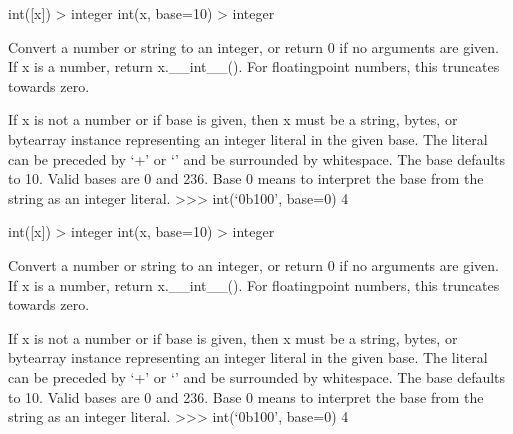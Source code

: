 \documentclass[letterpaper,10pt,english]{sphinxmanual}
\begin{document}
\begin{fulllineitems}
\label{\detokenize{clf_calculator:clf_calculator.H}}
\pysigstartsignatures
\pysigline
{}
\pysigstopsignatures
\sphinxAtStartPar
int({[}x{]}) \sphinxhyphen{}\textgreater{} integer
int(x, base=10) \sphinxhyphen{}\textgreater{} integer

\sphinxAtStartPar
Convert a number or string to an integer, or return 0 if no arguments
are given.  If x is a number, return x.\_\_int\_\_().  For floating\sphinxhyphen{}point
numbers, this truncates towards zero.

\sphinxAtStartPar
If x is not a number or if base is given, then x must be a string,
bytes, or bytearray instance representing an integer literal in the
given base.  The literal can be preceded by ‘+’ or ‘\sphinxhyphen{}’ and be surrounded
by whitespace.  The base defaults to 10.  Valid bases are 0 and 2\sphinxhyphen{}36.
Base 0 means to interpret the base from the string as an integer literal.
\textgreater{}\textgreater{}\textgreater{} int(‘0b100’, base=0)
4

\end{fulllineitems}


\begin{fulllineitems}
\label{\detokenize{clf_calculator:clf_calculator.CAUS}}
\pysigstartsignatures
\pysigline
{}
\pysigstopsignatures
\sphinxAtStartPar
int({[}x{]}) \sphinxhyphen{}\textgreater{} integer
int(x, base=10) \sphinxhyphen{}\textgreater{} integer

\sphinxAtStartPar
Convert a number or string to an integer, or return 0 if no arguments
are given.  If x is a number, return x.\_\_int\_\_().  For floating\sphinxhyphen{}point
numbers, this truncates towards zero.

\sphinxAtStartPar
If x is not a number or if base is given, then x must be a string,
bytes, or bytearray instance representing an integer literal in the
given base.  The literal can be preceded by ‘+’ or ‘\sphinxhyphen{}’ and be surrounded
by whitespace.  The base defaults to 10.  Valid bases are 0 and 2\sphinxhyphen{}36.
Base 0 means to interpret the base from the string as an integer literal.
\textgreater{}\textgreater{}\textgreater{} int(‘0b100’, base=0)
4

\end{fulllineitems}
\end{document}
